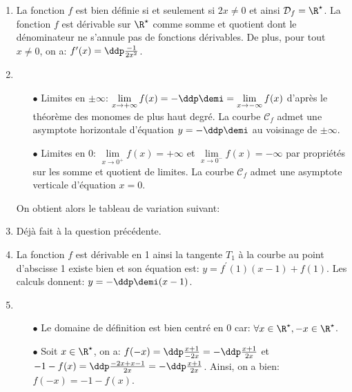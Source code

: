 \begin{correction}   \;
\begin{enumerate}
\item La fonction $f$ est bien d\'efinie si et seulement si $2x\not= 0$ et ainsi $\mathcal{D}_f=\R^{\star}$. La fonction $f$ est d\'erivable sur $\R^{\star}$ comme somme et quotient dont le d\'enominateur ne s'annule pas de fonctions d\'erivables. De plus, pour tout $x\not= 0$, on a: $f^{\prime}(x)=\ddp\frac{-1}{2x^2}$. 
\item 
\begin{itemize}
\item[$\bullet$] Limites en $\pm\infty$: $\lim\limits_{x\to +\infty}  f(x)=-\ddp\demi=\lim\limits_{x\to -\infty}  f(x)$ d'apr\`{e}s le th\'eor\`{e}me des monomes de plus haut degr\'e. La courbe $\mathcal{C}_f$ admet une asymptote horizontale d'\'equation $y=-\ddp\demi$ au voisinage de $\pm\infty$.
\item[$\bullet$] Limites en $0$: $\lim\limits_{x\to 0^+} f(x)=+\infty$ et $\lim\limits_{x\to 0^-} f(x)=-\infty$ par propri\'et\'es sur les somme et quotient de limites. La courbe $\mathcal{C}_f$ admet une asymptote verticale d'\'equation $x=0$. 
\end{itemize}
On obtient alors le tableau de variation suivant:
\begin{center}
\end{center}
\item D\'ej\`{a} fait \`{a} la question pr\'ec\'edente.
\item La fonction $f$ est d\'erivable en 1 ainsi la tangente $T_1$ \`{a} la courbe au point d'abscisse 1 existe bien et son \'equation est: $y=f^{\prime}(1)(x-1)+f(1)$. Les calculs donnent: $y=-\ddp\demi(x-1)$. 
\item 
\begin{itemize}
\item[$\bullet$] Le domaine de d\'efinition est bien centr\'e en 0 car: $\forall x\in\R^{\star}, -x\in\R^{\star}$.
\item[$\bullet$] Soit $x\in\R^{\star}$, on a: $f(-x)=\ddp\frac{x+1}{-2x}=-\ddp\frac{x+1}{2x}$ et 
$-1-f(x)=\ddp\frac{  -2x+x-1 }{2x}=-\ddp\frac{x+1}{2x}$. Ainsi, on a bien: $f(-x)=-1-f(x)$. 

\end{itemize}
\end{enumerate}
\end{correction}
